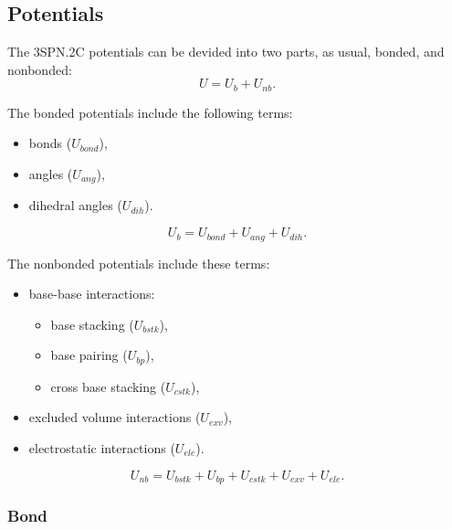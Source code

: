 \subsection{Potentials}
\label{subsec:dna_3spn2c_potential}

The 3SPN.2C potentials can be devided into two parts, as usual, bonded, and
nonbonded:
\begin{displaymath}
  U = U_b + U_{nb}.
\end{displaymath}

The bonded potentials include the following terms:
\begin{itemize}
\item bonds ($U_{bond}$),
\item angles ($U_{ang}$),
\item dihedral angles ($U_{dih}$).
\end{itemize}
\begin{equation}
  \label{eq:dna_3spn2c_local}
  U_b = U_{bond} + U_{ang} + U_{dih}.
\end{equation}

The nonbonded potentials include these terms:
\begin{itemize}
\item base-base interactions:
  \begin{itemize}
  \item base stacking ($U_{bstk}$),
  \item base pairing ($U_{bp}$),
  \item cross base stacking ($U_{cstk}$),
  \end{itemize}
\item excluded volume interactions ($U_{exv}$),
\item electrostatic interactions ($U_{ele}$).
\end{itemize}
\begin{equation}
  \label{eq:dna_3spn2c_nonlocal}
  U_{nb} = U_{bstk} + U_{bp} + U_{cstk} + U_{exv} + U_{ele}.
\end{equation}


\subsubsection{Bond}
\label{sec:dna_3spn2c_potential_bond}

